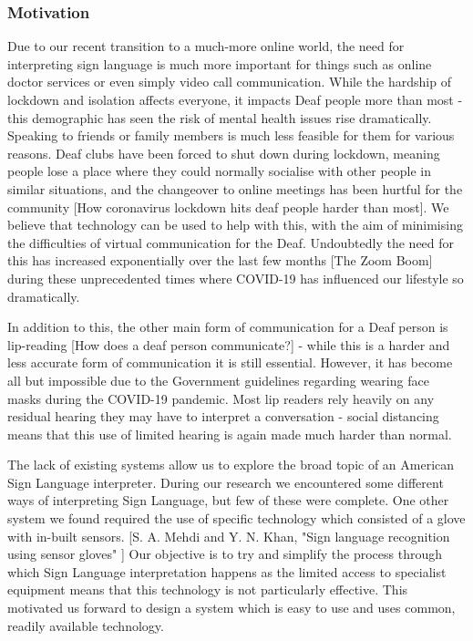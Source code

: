 \documentclass[10pt]{article}
\begin{document}
\subsubsection{Motivation}

Due to our recent transition to a much-more online world, the need for interpreting sign 
language is much more important for things such as online doctor services or even simply video call 
communication. 
While the hardship of lockdown and isolation affects everyone, it impacts Deaf people 
more than most - this demographic has seen the risk of mental health issues rise dramatically. 
Speaking to friends or family members is much less feasible for them for various reasons. 
Deaf clubs have been forced to shut down during lockdown, meaning people lose a place where they could normally 
socialise with other people in similar situations, and the changeover to online meetings has been hurtful for the 
community [How coronavirus lockdown hits deaf people harder than most].
We believe that technology can be used to help with this, with the aim of minimising the difficulties of virtual communication for the Deaf.
Undoubtedly the need for this has increased exponentially over the last few months [The Zoom Boom] 
during these unprecedented times where COVID-19 has influenced our lifestyle so dramatically.

In addition to this, the other main form of communication for a Deaf person is lip-reading [How does 
a deaf person communicate?] - while this is a harder and less accurate form of communication it is still 
essential. However, it has become all but impossible due to the Government guidelines regarding wearing 
face masks during the COVID-19 pandemic. Most lip readers rely heavily on any residual hearing they 
may have to interpret a conversation - social distancing means that this use of limited hearing is again made
much harder than normal. 

The lack of existing systems allow us to explore the broad topic of an American Sign 
Language interpreter. During our research we encountered some different ways of interpreting Sign 
Language, but few of these were complete. One other system we found 
required the use of specific technology which consisted of a glove with in-built sensors. [S. A. 
Mehdi and Y. N. Khan, "Sign language recognition using sensor gloves" ] Our objective is to try and 
simplify the process through which Sign Language interpretation happens as the limited access to 
specialist equipment means that this technology is not particularly effective. This motivated us forward to design a 
system which is easy to use and uses common, readily available technology. 
\end{document}
